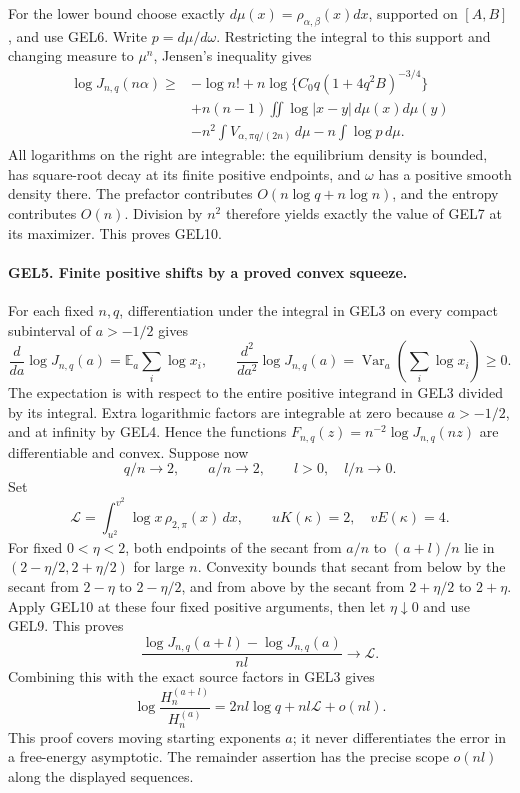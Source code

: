 \documentclass[11pt,a4paper]{article}
\begin{document}
For the lower bound choose exactly
\(d\mu(x)=\rho_{\alpha,\beta}(x)dx\), supported on \([A,B]\), and use
GEL6. Write \(p=d\mu/d\omega\). Restricting the integral to this support
and changing measure to \(\mu^n\), Jensen's inequality gives
\begin{align*}
 \log J_{n,q}(n\alpha)\geq{}&-
 \log n!+n\log\{C_0q(1+4q^2B)^{-3/4}\}\\
 &+n(n-1)\iint\log|x-y|\,d\mu(x)d\mu(y)\\
 &-n^2\int V_{\alpha,\pi q/(2n)}\,d\mu
       -n\int\log p\,d\mu .
\end{align*}
All logarithms on the right are integrable: the equilibrium density is
bounded, has square-root decay at its finite positive endpoints, and
\(\omega\) has a positive smooth density there. The prefactor contributes
\(O(n\log q+n\log n)\), and the entropy contributes \(O(n)\).
Division by \(n^2\) therefore yields exactly the value of GEL7 at its
maximizer. This proves GEL10.

\paragraph{GEL5. Finite positive shifts by a proved convex squeeze.}
For each fixed \(n,q\), differentiation under the integral in GEL3 on
every compact subinterval of \(a>-1/2\) gives
\[
 \frac{d}{da}\log J_{n,q}(a)=
    \mathbb E_a\sum_i\log x_i,\qquad
 \frac{d^2}{da^2}\log J_{n,q}(a)=
    \operatorname{Var}_a\!\left(\sum_i\log x_i\right)\geq0.
 \tag{GEL11}
\]
The expectation is with respect to the entire positive integrand in
GEL3 divided by its integral. Extra logarithmic factors are integrable
at zero because \(a>-1/2\), and at infinity by GEL4. Hence the
functions \(F_{n,q}(z)=n^{-2}\log J_{n,q}(nz)\) are differentiable
and convex. Suppose now
\[
 q/n\longrightarrow2,\qquad a/n\longrightarrow2,\qquad
 l>0,\quad l/n\longrightarrow0.
\]
Set
\[
 \mathcal L=\int_{u^2}^{v^2}\log x\,\rho_{2,\pi}(x)\,dx,
 \qquad uK(\kappa)=2,\quad vE(\kappa)=4.
 \tag{GEL12}
\]
For fixed \(0<\eta<2\), both endpoints of the secant from \(a/n\) to
\((a+l)/n\) lie in \((2-\eta/2,2+\eta/2)\) for large \(n\).
Convexity bounds that secant from below by the secant from
\(2-\eta\) to \(2-\eta/2\), and from above by the secant from
\(2+\eta/2\) to \(2+\eta\). Apply GEL10 at these four fixed positive
arguments, then let \(\eta\downarrow0\) and use GEL9. This proves
\[
 \frac{\log J_{n,q}(a+l)-\log J_{n,q}(a)}{nl}
       \longrightarrow\mathcal L.
\]
Combining this with the exact source factors in GEL3 gives
\[
 \boxed{\log\frac{H_n^{(a+l)}}{H_n^{(a)}}
       =2nl\log q+nl\mathcal L+o(nl).}
 \tag{GEL13}
\]
This proof covers moving starting exponents \(a\); it never differentiates
the error in a free-energy asymptotic. The remainder assertion has the
precise scope \(o(nl)\) along the displayed sequences.
\end{document}
